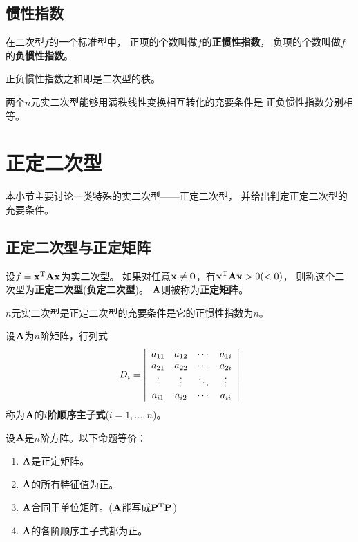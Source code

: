 \subsection{惯性指数}
\begin{definition}[正负惯性指数]
  在二次型$f$的一个标准型中，
  正项的个数叫做$f$的\textbf{正惯性指数}，
  负项的个数叫做$f$的\textbf{负惯性指数}。
\end{definition}

\begin{remark}
  正负惯性指数之和即是二次型的秩。
\end{remark}

\begin{theorem}
  两个$n$元实二次型能够用满秩线性变换相互转化的充要条件是
  正负惯性指数分别相等。
\end{theorem}

\section{正定二次型}
本小节主要讨论一类特殊的实二次型——正定二次型，
并给出判定正定二次型的充要条件。

\subsection{正定二次型与正定矩阵}
\begin{definition}[正定二次型与正定矩阵]
  设$f=\mvx^\mT\mmA\mvx$为实二次型。
  如果对任意$\mvx\neq\mvZero$，有$\mvx^\mT\mmA\mvx > 0(<0)$，
  则称这个二次型为\textbf{正定二次型}(\textbf{负定二次型})。
  $\mmA$则被称为\textbf{正定矩阵}。
\end{definition}

\begin{theorem}[正定二次型的充要条件]
  $n$元实二次型是正定二次型的充要条件是它的正惯性指数为$n$。
\end{theorem}

\begin{definition}[顺序主子式]
  设$\mmA$为$n$阶矩阵，行列式
  \begin{displaymath}
    D_i=\mdet{cccc}{
      a_{11} & a_{12} & \cdots & a_{1i} \\
      a_{21} & a_{22} & \cdots & a_{2i} \\
      \vdots & \vdots & \ddots & \vdots \\
      a_{i1} & a_{i2} & \cdots & a_{ii} }
  \end{displaymath}
  称为$\mmA$的\textbf{$i$阶顺序主子式}($i=1,\dots,n$)。
\end{definition}

\begin{theorem}[正定矩阵的充要条件]
  设$\mmA$是$n$阶方阵。以下命题等价：
  \begin{enumerate}
    \item
    $\mmA$是正定矩阵。
    \item
    $\mmA$的所有特征值为正。
    \item
    $\mmA$合同于单位矩阵。($\mmA$能写成$\mmP^\mT\mmP$)
    \item
    $\mmA$的各阶顺序主子式都为正。
  \end{enumerate}
\end{theorem}